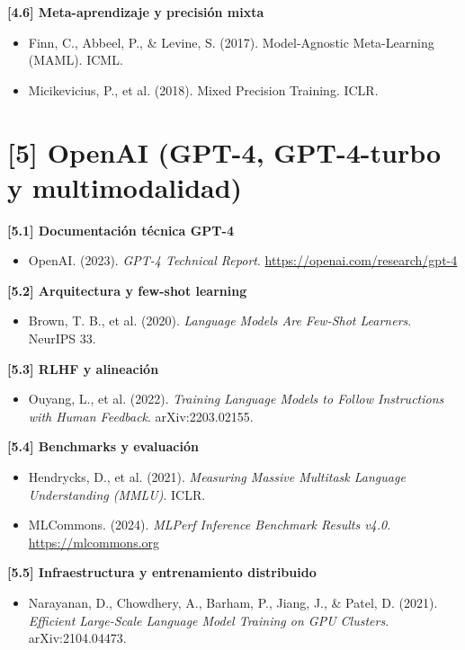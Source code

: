 \documentclass[12pt,a4paper]{report}
\numberwithin{figure}{section}
\begin{document}
\textbf{[4.6] Meta-aprendizaje y precisión mixta}
\label{ref:4.6}
\begin{itemize}
  \item Finn, C., Abbeel, P., \& Levine, S. (2017). Model-Agnostic Meta-Learning (MAML). ICML.
  \item Micikevicius, P., et al. (2018). Mixed Precision Training. ICLR.
\end{itemize}

\section*{[5] OpenAI (GPT-4, GPT-4-turbo y multimodalidad)}
\label{ref:5}

\textbf{[5.1] Documentación técnica GPT-4}
\label{ref:5.1}
\begin{itemize}
  \item OpenAI. (2023). \textit{GPT-4 Technical Report}. \url{https://openai.com/research/gpt-4}
\end{itemize}

\textbf{[5.2] Arquitectura y few-shot learning}
\label{ref:5.2}
\begin{itemize}
  \item Brown, T. B., et al. (2020). \textit{Language Models Are Few-Shot Learners}. NeurIPS 33.
\end{itemize}

\textbf{[5.3] RLHF y alineación}
\label{ref:5.3}
\begin{itemize}
  \item Ouyang, L., et al. (2022). \textit{Training Language Models to Follow Instructions with Human Feedback}. arXiv:2203.02155.
\end{itemize}

\textbf{[5.4] Benchmarks y evaluación}
\label{ref:5.4}
\begin{itemize}
  \item Hendrycks, D., et al. (2021). \textit{Measuring Massive Multitask Language Understanding (MMLU)}. ICLR.
  \item MLCommons. (2024). \textit{MLPerf Inference Benchmark Results v4.0}. \url{https://mlcommons.org}
\end{itemize}

\textbf{[5.5] Infraestructura y entrenamiento distribuido}
\label{ref:5.5}
\begin{itemize}
  \item Narayanan, D., Chowdhery, A., Barham, P., Jiang, J., \& Patel, D. (2021). \textit{Efficient Large-Scale Language Model Training on GPU Clusters}. arXiv:2104.04473.
\end{itemize}
\end{document}
